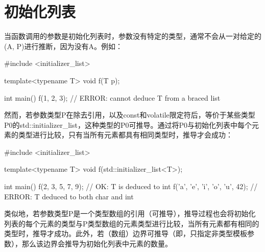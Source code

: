 \section{初始化列表}
当函数调用的参数是初始化列表时，参数没有特定的类型，通常不会从一对给定的(A, P)进行推断，因为没有A。例如：

\begin{cpp}
#include <initializer_list>

template<typename T> void f(T p);

int main() {
	f({1, 2, 3}); // ERROR: cannot deduce T from a braced list
}
\end{cpp}

然而，若参数类型P在除去引用，以及const和volatile限定符后，等价于某些类型P0的std::initializer\_list，这种类型的P0可推导。通过将P0与初始化列表中每个元素的类型进行比较，只有当所有元素都具有相同类型时，推导才会成功：

\begin{cpp}
#include <initializer_list>

template<typename T> void f(std::initializer_list<T>);

int main()
{
	f({2, 3, 5, 7, 9}); // OK: T is deduced to int
	f({'a', 'e', 'i', 'o', 'u', 42}); // ERROR: T deduced to both char and int
}
\end{cpp}

类似地，若参数类型P是一个类型数组的引用（可推导），推导过程也会将初始化列表的每个元素的类型与P类型数组的元素类型进行比较，当所有元素都有相同的类型时，推导才成功。此外，若（数组）边界可推导（即，只指定非类型模板参数），那么该边界会推导为初始化列表中元素的数量。












































